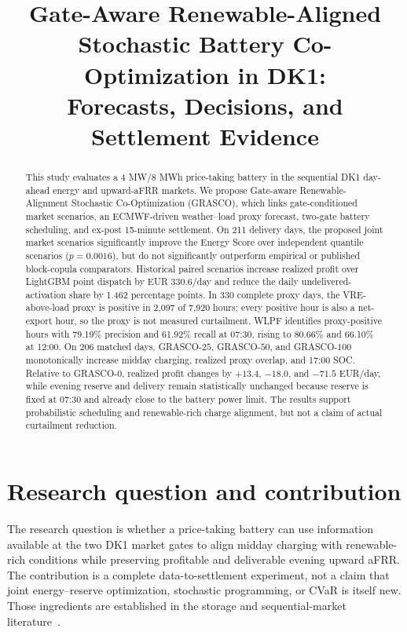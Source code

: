 \documentclass[11pt,a4paper]{article}
\title{Gate-Aware Renewable-Aligned Stochastic Battery Co-Optimization in DK1:\\
Forecasts, Decisions, and Settlement Evidence}
\author{}
\date{}
\begin{document}
\maketitle

\begin{abstract}
This study evaluates a 4 MW/8 MWh price-taking battery in the sequential DK1
day-ahead energy and upward-aFRR markets.  We propose Gate-aware
Renewable-Alignment Stochastic Co-Optimization (GRASCO), which links
gate-conditioned market scenarios, an ECMWF-driven weather--load proxy
forecast, two-gate battery scheduling, and ex-post 15-minute settlement.  On
211 delivery days, the proposed joint market scenarios significantly improve
the Energy Score over independent quantile scenarios ($p=0.0016$), but do not
significantly outperform empirical or published block-copula comparators.
Historical paired scenarios increase realized profit over LightGBM point
dispatch by EUR 330.6/day and reduce the daily undelivered-activation share by
1.462 percentage points.  In 330 complete proxy days, the VRE-above-load proxy
is positive in 2,097 of 7,920 hours; every positive hour is also a net-export
hour, so the proxy is not measured curtailment.  WLPF identifies proxy-positive
hours with 79.19\% precision and 61.92\% recall at 07:30, rising to 80.66\%
and 66.10\% at 12:00.  On 206 matched days, GRASCO-$25$, GRASCO-$50$, and
GRASCO-$100$ monotonically increase midday charging, realized proxy overlap,
and 17:00 SOC.  Relative to GRASCO-$0$, realized profit changes by $+13.4$,
$-18.0$, and $-71.5$ EUR/day, while evening reserve and delivery remain
statistically unchanged because reserve is fixed at 07:30 and already close
to the battery power limit.  The results support probabilistic scheduling and
renewable-rich charge alignment, but not a claim of actual curtailment
reduction.
\end{abstract}

\section{Research question and contribution}

The research question is whether a price-taking battery can use information
available at the two DK1 market gates to align midday charging with
renewable-rich conditions while preserving profitable and deliverable evening
upward aFRR.  The contribution is a complete data-to-settlement experiment,
not a claim that joint energy--reserve optimization, stochastic programming,
or CVaR is itself new.  Those ingredients are established in the storage and
sequential-market literature~\cite{toubeau2021,allawati2021,mancini2024,rockafellar2000}.
\end{document}
